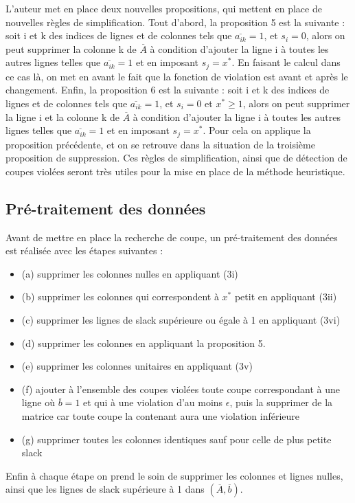 \documentclass[12pt]{report}
\begin{document}
\newline
\newline
L'auteur met en place deux nouvelles propositions, qui mettent en place de nouvelles règles de simplification.
\newline
Tout d'abord, la proposition 5 est la suivante : soit i et k des indices de lignes et de colonnes tels que $\overset{\_}{a_{ik}}=1$, et $s_i=0$, alors on peut supprimer la colonne k de $\overset{\_}{A}$ à condition d'ajouter la ligne i à toutes les autres lignes telles que $\overset{\_}{a_{ik}}=1$ et en imposant $s_j=x^\ast$.
En faisant le calcul dans ce cas là, on met en avant le fait que la fonction de violation est avant et après le changement.
\newline
Enfin, la proposition 6 est la suivante : soit i et k des indices de lignes et de colonnes tels que $\overset{\_}{a_{ik}}=1$, et $s_i=0$ et $x^\ast \ge 1$, alors on peut supprimer la ligne i et la colonne k de $\overset{\_}{A}$ à condition d'ajouter la ligne i à toutes les autres lignes telles que $\overset{\_}{a_{ik}}=1$ et en imposant $s_j=x^\ast$. Pour cela on applique la proposition précédente, et on se retrouve dans la situation de la troisième proposition de suppression.
\newline
\newline
Ces règles de simplification, ainsi que de détection de coupes violées seront très utiles pour la mise en place de la méthode heuristique. 

\subsection{Pré-traitement des données}
Avant de mettre en place la recherche de coupe, un pré-traitement des données est réalisée avec les étapes suivantes : 
\begin{itemize}
    \item (a) supprimer les colonnes nulles en appliquant (3i)
    \item (b) supprimer les colonnes qui correspondent à $x^\ast$ petit en appliquant (3ii)
    \item (c) supprimer les lignes de slack supérieure ou égale à 1 en appliquant (3vi)
    \item (d) supprimer les colonnes en appliquant la proposition 5.
    \item (e) supprimer les colonnes unitaires en appliquant (3v)
    \item (f) ajouter à l'ensemble des coupes violées toute coupe correspondant à une ligne où $\overset{\_}{b}=1$ et qui à une violation d'au moins $\epsilon$, puis la supprimer de la matrice car toute coupe la contenant aura une violation inférieure
    \item (g) supprimer toutes les colonnes identiques sauf pour celle de plus petite slack
\end{itemize}
Enfin à chaque étape on prend le soin de supprimer les colonnes et lignes nulles, ainsi que les lignes de slack supérieure à 1 dans $(\overset{\_}{A},\overset{\_}{b})$.
\end{document}
